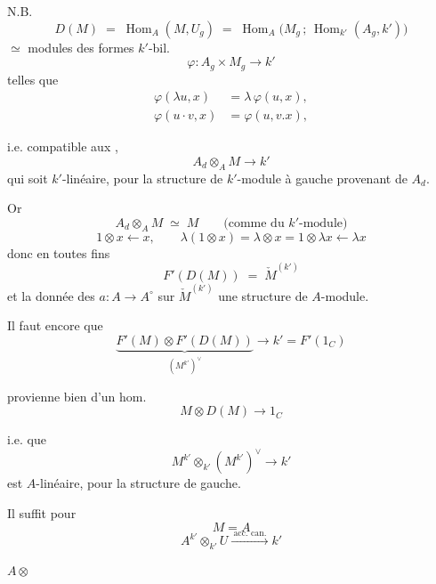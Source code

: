 \documentclass[11pt,a4paper]{article}
\begin{document}

N.B.
\[
D(M) \;=\; \operatorname{Hom}_{A}(M, U_{g})
\;=\; \operatorname{Hom}_{A}\bigl(M_{g}\,;\, \operatorname{Hom}_{k'}(A_{g}, k')\bigr)
\]
$\simeq$  modules des formes $k'$-bil.
\[
\varphi : A_{g} \times M_{g} \longrightarrow k'
\]
telles que
\begin{align*}
\varphi(\lambda u, x) &= \lambda\,\varphi(u,x), \\
\varphi(u \cdot v, x) &= \varphi(u, v.x),
\end{align*}

i.e. compatible aux \ill{}, 
\[
A_{d} \otimes_{A} M \longrightarrow k'
\]
qui soit $k'$-linéaire, pour la structure de $k'$-module à gauche provenant de
$A_{d}$.

Or
\[
A_{d} \otimes_{A} M \;\simeq\; M \qquad \text{(comme du $k'$-module)}
\]
\[
1 \otimes x \longleftarrow x,
\qquad
\lambda(1 \otimes x) = \lambda \otimes x = 1 \otimes \lambda x \longleftarrow \lambda x
\]
donc en toutes fins
\[
F'(D(M)) \;=\; \check{M}^{(k')}
\]
et la donnée des $a : A \to A^{\circ}$ \ill{} \ill{} sur $\check{M}^{(k')}$ une
structure de $A$-module.

Il faut encore que
\[
\underbrace{F'(M) \otimes F'(D(M))}_{(M^{k'})^{\vee}}
\longrightarrow k' = F'(1_{C})
\]

provienne bien  d'un hom.
\[
M \otimes D(M) \longrightarrow 1_{C}
\]


i.e. que
\[
M^{k'} \otimes_{k'} (M^{k'})^{\vee} \longrightarrow k'
\]
est $A$-linéaire, pour la structure  de gauche.


Il suffit  pour
\[
M = A
\]
\[
A^{k'} \otimes_{k'} U \xrightarrow{\ \text{acc. can.}\ } k'
\]

$A \otimes$ \ill{}

\end{document}
